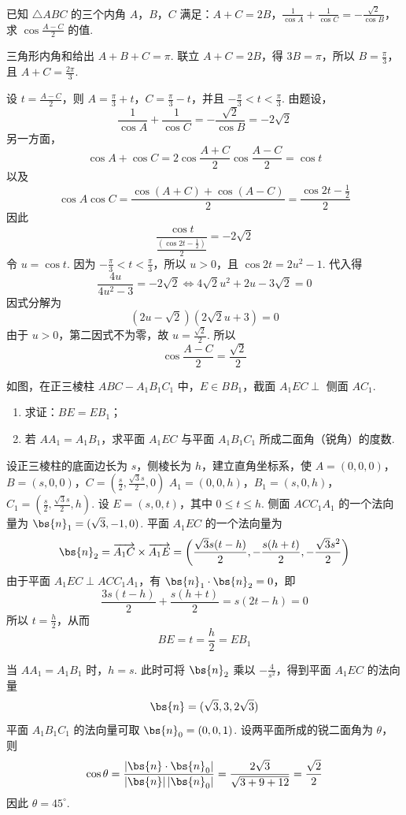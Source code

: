\begin{problem}
已知 \(\triangle ABC\) 的三个内角 \(A\)，\(B\)，\(C\) 满足：\(A + C = 2B\)，\(\frac{1}{\cos A} + \frac{1}{\cos C} = -\frac{\sqrt{2}}{\cos B}\)，求 \(\cos \frac{A - C}{2}\) 的值.
\end{problem}

\begin{solution}
三角形内角和给出 \(A+B+C=\pi\). 联立 \(A+C=2B\)，得 \(3B=\pi\)，所以 \(B=\frac{\pi}{3}\)，且 \(A+C=\frac{2\pi}{3}\).

设 \(t=\frac{A-C}{2}\)，则 \(A=\frac{\pi}{3}+t\)，\(C=\frac{\pi}{3}-t\)，并且 \(-\frac{\pi}{3}<t<\frac{\pi}{3}\). 由题设，
\[
\frac1{\cos A}+\frac1{\cos C}
=-\frac{\sqrt2}{\cos B}
=-2\sqrt2
\]
另一方面，
\[
\cos A+\cos C
=2\cos\frac{A+C}{2}\cos\frac{A-C}{2}
=\cos t
\]
以及
\[
\cos A\cos C
=\frac{\cos(A+C)+\cos(A-C)}2
=\frac{\cos2t-\frac12}{2}
\]
因此
\[
\frac{\cos t}{\frac{(\cos2t-\frac12)}{2}}=-2\sqrt2
\]
令 \(u=\cos t\). 因为 \(-\frac{\pi}{3}<t<\frac{\pi}{3}\)，所以 \(u>0\)，且 \(\cos2t=2u^2-1\). 代入得
\[
\frac{4u}{4u^2-3}=-2\sqrt2
\Longleftrightarrow
4\sqrt2u^2+2u-3\sqrt2=0
\]
因式分解为
\[
(2u-\sqrt2)(2\sqrt2u+3)=0
\]
由于 \(u>0\)，第二因式不为零，故 \(u=\frac{\sqrt2}{2}\). 所以
\[
\cos\frac{A-C}{2}=\frac{\sqrt2}{2}
\]
\end{solution}

\begin{problem}
如图，在正三棱柱 \(ABC-A_{1}B_{1}C_{1}\) 中，\(E \in BB_{1}\)，截面 \(A_{1}EC \perp\) 侧面 \(AC_{1}\).

\begin{enumerate}
\item 求证：\(BE = EB_{1}\)；
\item 若 \(AA_{1} = A_{1}B_{1}\)，求平面 \(A_{1}EC\) 与平面 \(A_{1}B_{1}C_{1}\) 所成二面角（锐角）的度数.
\end{enumerate}

\FloatBarrier
\end{problem}

\begin{solution}
设正三棱柱的底面边长为 \(s\)，侧棱长为 \(h\)，建立直角坐标系，使
\(A=(0,0,0)\)，\(B=(s,0,0)\)，\(C=\left(\frac s2,\frac{\sqrt3s}{2},0\right)\)
\(A_1=(0,0,h)\)，\(B_1=(s,0,h)\)，\(C_1=\left(\frac s2,\frac{\sqrt3s}{2},h\right)\).
设 \(E=(s,0,t)\)，其中 \(0\leqslant t\leqslant h\). 侧面 \(ACC_1A_1\) 的一个法向量为 \(\bs{n}_1=(\sqrt3,-1,0)\). 平面 \(A_1EC\) 的一个法向量为
\[
\bs{n}_2=\overrightarrow{A_1C}\times\overrightarrow{A_1E}
=\left(\frac{\sqrt3s(t-h)}2,-\frac{s(h+t)}2,-\frac{\sqrt3s^2}2\right)
\]
由于平面 \(A_1EC\perp ACC_1A_1\)，有 \(\bs{n}_1\cdot\bs{n}_2=0\)，即
\[
\frac{3s(t-h)}2+\frac{s(h+t)}2=s(2t-h)=0
\]
所以 \(t=\frac h2\)，从而
\[
BE=t=\frac h2=EB_1
\]

当 \(AA_1=A_1B_1\) 时，\(h=s\). 此时可将 \(\bs{n}_2\) 乘以 \(-\frac4{s^2}\)，得到平面 \(A_1EC\) 的法向量
\[
\bs{n}=(\sqrt3,3,2\sqrt3)
\]
平面 \(A_1B_1C_1\) 的法向量可取 \(\bs{n}_0=(0,0,1)\). 设两平面所成的锐二面角为 \(\theta\)，则
\[
\cos\theta=\frac{|\bs{n}\cdot\bs{n}_0|}{|\bs{n}|\,|\bs{n}_0|}
=\frac{2\sqrt3}{\sqrt{3+9+12}}
=\frac{\sqrt2}{2}
\]
因此 \(\theta=45^{\circ}\).
\end{solution}

